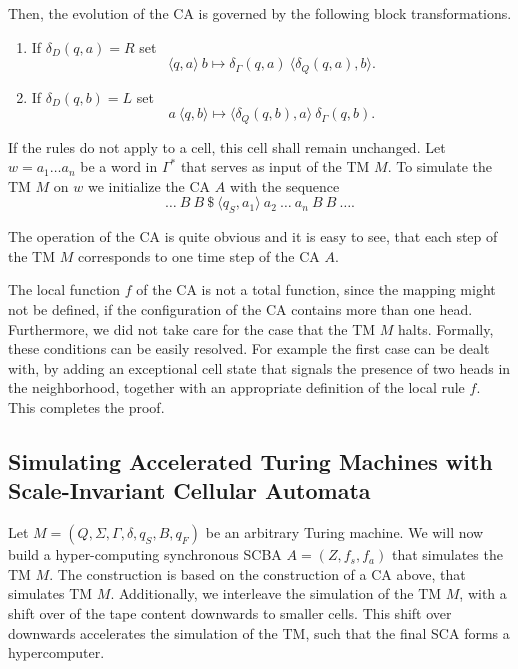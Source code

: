 \documentclass[pre,amssymb,showpacs,showkeys,preprint]{revtex4}
\begin{document}
Then, the evolution of the CA is governed by the following block transformations.

\begin{enumerate}

\item If $\delta_D(q,a) = R$ set
\[
\langle q,a \rangle \: b \mapsto \delta_\Gamma(q,a) \: \langle \delta_Q(q,a), b \rangle.
\]

\item If $\delta_D(q, b) = L$ set
\[
a \: \langle q,b \rangle \mapsto \langle \delta_Q(q,b),a \rangle \: \delta_\Gamma(q,b).
\]

\end{enumerate}

If the rules do not apply to a cell, this cell shall remain unchanged.
Let $w=a_1 \ldots a_n$ be a word in $\Gamma^*$ that serves as input of the TM $M$.
To simulate the TM $M$ on $w$ we initialize the CA $A$ with
the sequence
\[
\ldots \: B \: B \: \$ \: \langle q_S, a_1 \rangle \: a_2 \: \ldots \: a_n \: B \: B \: \ldots.
\]

The operation of the CA is quite obvious and it is easy to see, that each step of the TM $M$
corresponds to one time step of the CA $A$.

The local function $f$ of the CA is not a total function, since the mapping might
not be defined, if the configuration of the CA contains more than one head.
Furthermore, we did not take care for the case that the TM $M$ halts.
Formally, these conditions can be easily resolved.
For example the first case can be dealt with,
by adding an exceptional cell state that signals the presence of two heads in the neighborhood,
together with an appropriate definition of the local rule $f$.
This completes the proof.

\subsection{Simulating Accelerated Turing Machines with Scale-Invariant Cellular Automata}

Let $M = (Q, \Sigma, \Gamma, \delta, q_S, B, q_F)$ be an arbitrary Turing machine.
We will now build a hyper-computing synchronous SCBA $A = (Z, f_s, f_a)$ that simulates the TM $M$.
The construction is based on the construction of a CA above, that simulates TM $M$.
Additionally, we interleave the simulation of the TM $M$, with a shift over of the tape
content downwards to smaller cells.
This shift over downwards accelerates the simulation of the TM, such that the final SCA forms a
hypercomputer.
\end{document}
